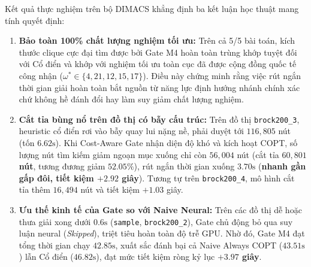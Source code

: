 \documentclass[11pt,a4paper]{article}
\begin{document}
Kết quả thực nghiệm trên bộ DIMACS khẳng định ba kết luận học thuật mang tính quyết định:
\begin{enumerate}[leftmargin=*]
    \item \textbf{Bảo toàn 100\% chất lượng nghiệm tối ưu:} Trên cả 5/5 bài toán, kích thước clique cực đại tìm được bởi Gate M4 hoàn toàn trùng khớp tuyệt đối với Cổ điển và khớp với nghiệm tối ưu toàn cục đã được cộng đồng quốc tế công nhận ($\omega^* \in \{4, 21, 12, 15, 17\}$). Điều này chứng minh rằng việc rút ngắn thời gian giải hoàn toàn bắt nguồn từ năng lực định hướng nhánh chính xác chứ không hề đánh đổi hay làm suy giảm chất lượng nghiệm.
    \item \textbf{Cắt tỉa bùng nổ trên đồ thị có bẫy cấu trúc:} Trên đồ thị \texttt{brock200\_3}, heuristic cổ điển rơi vào bẫy quay lui nặng nề, phải duyệt tới $116,805$ nút (tốn $6.62\text{s}$). Khi Cost-Aware Gate nhận diện độ khó và kích hoạt COPT, số lượng nút tìm kiếm giảm ngoạn mục xuống chỉ còn $56,004$ nút (cắt tỉa \textbf{$60,801$ nút}, tương đương giảm $52.05\%$), rút ngắn thời gian xuống $3.70\text{s}$ (\textbf{nhanh gần gấp đôi, tiết kiệm $+2.92$ giây}). Tương tự trên \texttt{brock200\_4}, mô hình cắt tỉa thêm $16,494$ nút và tiết kiệm $+1.03$ giây.
    \item \textbf{Ưu thế kinh tế của Gate so với Naive Neural:} Trên các đồ thị dễ hoặc thưa giải xong dưới $0.6\text{s}$ (\texttt{sample}, \texttt{brock200\_2}), Gate chủ động bỏ qua suy luận neural (\textit{Skipped}), triệt tiêu hoàn toàn độ trễ GPU. Nhờ đó, Gate M4 đạt tổng thời gian chạy $42.85\text{s}$, xuất sắc đánh bại cả Naive Always COPT ($43.51\text{s}$) lẫn Cổ điển ($46.82\text{s}$), đạt mức tiết kiệm ròng kỷ lục \textbf{$+3.97$ giây}.
\end{enumerate}
\end{document}
